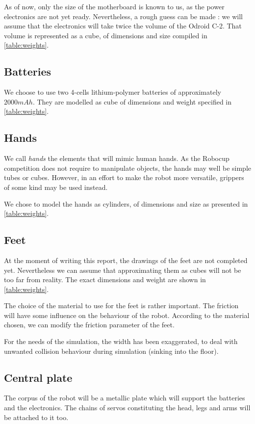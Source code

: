 As of now, only the size of the motherboard is known to us, as the power electronics are not yet ready. Nevertheless, a rough guess can be made : we will assume that the electronics will take twice the volume of the Odroid C-2. That volume is represented as a cube, of dimensions and size compiled in \cref{table:weights}.

\subsection{Batteries}
We choose to use two 4-cells lithium-polymer batteries of approximately $2000mAh$. They are modelled as cube of dimensions and weight specified in \cref{table:weights}.

\subsection{Hands}
We call \emph{hands} the elements that will mimic human hands. As the Robocup competition does not require to manipulate objects, the hands may well be simple tubes or cubes. However, in an effort to make the robot more versatile, grippers of some kind may be used instead.

We chose to model the hands as cylinders, of dimensions and size as presented in \cref{table:weights}.

\subsection{Feet}
At the moment of writing this report, the drawings of the feet are not completed yet. Nevertheless we can assume that approximating them as cubes will not be too far from reality. The exact dimensions and weight are shown in \cref{table:weights}.

The choice of the material to use for the feet is rather important. The friction will have some influence on the behaviour of the robot. According to the material chosen, we can modify the friction parameter of the feet.

For the needs of the simulation, the width has been exaggerated, to deal with unwanted collision behaviour during simulation (sinking into the floor). 

\subsection{Central plate}
The corpus of the robot will be a metallic plate which will support the batteries and the electronics. The chains of servos constituting the head, legs and arms will be attached to it too.

